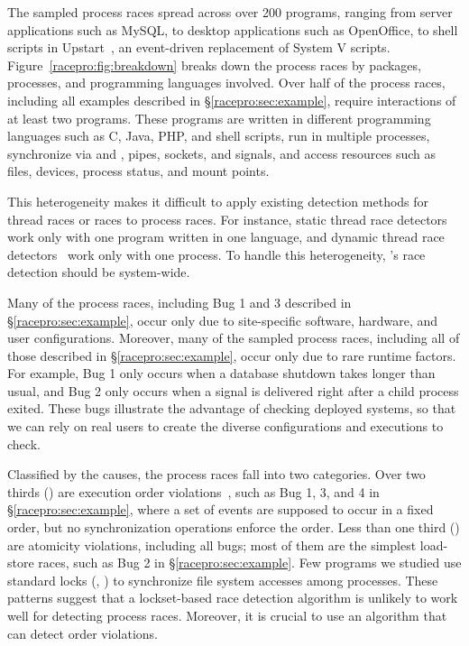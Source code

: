   The sampled process races
spread across over 200 programs, ranging from server
applications such as MySQL, to desktop applications such as OpenOffice,
to shell scripts in Upstart~\cite{upstart}, an event-driven
replacement of System V  scripts.  Figure~\ref{racepro:fig:breakdown}
breaks down the process races by packages, processes, and
programming languages involved.  Over half of the \nprace process races,
including all examples described in \S\ref{racepro:sec:example}, require 
interactions of at least two programs.  These programs are written in
different programming languages such as C, Java, PHP, and shell scripts,
run in multiple processes, synchronize via  and ,
pipes, sockets, and signals, and access resources such as files, devices,
process status, and mount points.

This heterogeneity makes it difficult to apply existing detection methods
for thread races or \toctou races to process races.  For instance, static thread
race detectors~\cite{racerx:sosp03} work only with one program
written in one language, and dynamic thread race
detectors~\cite{yu:racetrack:sosp} work only with one process.  To
handle this heterogeneity, \racepro's race detection should be
system-wide. 

 Many of the process races,
including Bug 1 and 3 described in
\S\ref{racepro:sec:example}, occur only due to site-specific software,
hardware, and user configurations.  Moreover, many of the sampled
process races, including all of those described in
\S\ref{racepro:sec:example}, occur only due to rare runtime factors. For
example, Bug 1 only occurs when a database shutdown takes longer 
than usual, and Bug 2 only occurs when a signal is delivered right 
after a child process exited.
These bugs illustrate the advantage of checking deployed systems, so that
we can rely on real users to create the diverse configurations and
executions to check.

  Classified by the causes, the
\nprace process races fall into two categories.  Over two
thirds (\norder) are execution order
violations~\cite{lu:concurrency-bugs}, 
such as Bug 1, 3, and 4 in \S\ref{racepro:sec:example},
where a set of events are
supposed to occur in a fixed order, but no synchronization operations
enforce the order.
Less than one third (\natomic) are atomicity violations, including all
\toctou bugs; most of them are the simplest load-store
races, such as Bug 2 in \S\ref{racepro:sec:example}. 
Few programs we studied use standard locks (\eg, ) to
synchronize file system accesses among processes.
These patterns suggest that a lockset-based race detection algorithm is
unlikely to work well for detecting process races.  Moreover, it is crucial
to use an algorithm that can detect order violations.

